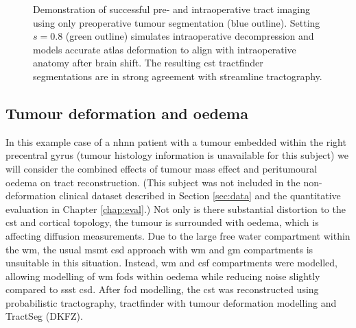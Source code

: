 \begin{figure}[h!]
  \centering
  
  \caption{Demonstration of successful pre- and intraoperative tract imaging using only preoperative tumour segmentation (blue outline). Setting $s=0.8$ (green outline) simulates intraoperative decompression and models accurate atlas deformation to align with intraoperative anatomy after brain shift. The resulting \gls{cst} tractfinder segmentations are in strong agreement with streamline tractography.}
  \label{fig:shrink}
\end{figure}

\subsection{Tumour deformation and oedema}

In this example case of a \gls{nhnn} patient with a tumour embedded within the right precentral gyrus (tumour histology information is unavailable for this subject) we will consider the combined effects of tumour mass effect and peritumoural oedema on tract reconstruction.
(This subject was not included in the non-deformation clinical dataset described in Section \ref{sec:data} and the quantitative evaluation in Chapter \ref{chap:eval}.)
Not only is there substantial distortion to the \gls{cst} and cortical topology, the tumour is surrounded with oedema, which is affecting diffusion measurements.
Due to the large free water compartment within the \gls{wm}, the usual \gls{msmt} \gls{csd} approach with \gls{wm} and \gls{gm} compartments is unsuitable in this situation.
Instead, \gls{wm} and \gls{csf} compartments were modelled, allowing modelling of \gls{wm} \glspl{fod} within oedema while reducing noise slightly compared to \gls{ssst} \gls{csd}.
After \gls{fod} modelling, the \gls{cst} was reconstructed using probabilistic tractography, tractfinder with tumour deformation modelling and TractSeg (DKFZ).


